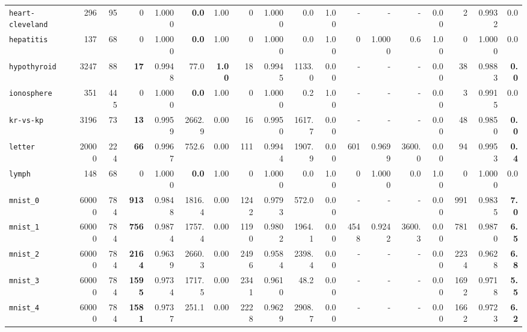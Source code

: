 \begin{tabular}{lccrrrrrrrrrrrrrrr}
\texttt{heart-cleveland} & \multicolumn{1}{r}{296} & \multicolumn{1}{r}{95}  & 0 & 1.0000 & \textbf{0.0} & 1.00 & 0 & 1.0000 & 0.0 & 1.00 & - & - & - & 0.00 & 2 & 0.9932 & 0.0\\
\texttt{hepatitis} & \multicolumn{1}{r}{137} & \multicolumn{1}{r}{68}  & 0 & 1.0000 & \textbf{0.0} & 1.00 & 0 & 1.0000 & 0.0 & 1.00 & 0 & 1.0000 & 0.6 & 1.00 & 0 & 1.0000 & 0.0\\
\texttt{hypothyroid} & \multicolumn{1}{r}{3247} & \multicolumn{1}{r}{88}  & \textbf{17} & 0.9948 & 77.0 & \textbf{1.00} & 18 & 0.9945 & 1133.0 & 0.00 & - & - & - & 0.00 & 38 & 0.9883 & \textbf{0.0}\\
\texttt{ionosphere} & \multicolumn{1}{r}{351} & \multicolumn{1}{r}{445}  & 0 & 1.0000 & \textbf{0.0} & 1.00 & 0 & 1.0000 & 0.2 & 1.00 & - & - & - & 0.00 & 3 & 0.9915 & 0.0\\
\texttt{kr-vs-kp} & \multicolumn{1}{r}{3196} & \multicolumn{1}{r}{73}  & \textbf{13} & 0.9959 & 2662.9 & 0.00 & 16 & 0.9950 & 1617.7 & 0.00 & - & - & - & 0.00 & 48 & 0.9850 & \textbf{0.0}\\
\texttt{letter} & \multicolumn{1}{r}{20000} & \multicolumn{1}{r}{224}  & \textbf{66} & 0.9967 & 752.6 & 0.00 & 111 & 0.9944 & 1907.9 & 0.00 & 601 & 0.9699 & 3600.0 & 0.00 & 94 & 0.9953 & \textbf{0.4}\\
\texttt{lymph} & \multicolumn{1}{r}{148} & \multicolumn{1}{r}{68}  & 0 & 1.0000 & \textbf{0.0} & 1.00 & 0 & 1.0000 & 0.0 & 1.00 & 0 & 1.0000 & 0.0 & 1.00 & 0 & 1.0000 & 0.0\\
\texttt{mnist\_0} & \multicolumn{1}{r}{60000} & \multicolumn{1}{r}{784}  & \textbf{913} & 0.9848 & 1816.4 & 0.00 & 1242 & 0.9793 & 572.0 & 0.00 & - & - & - & 0.00 & 991 & 0.9835 & \textbf{7.0}\\
\texttt{mnist\_1} & \multicolumn{1}{r}{60000} & \multicolumn{1}{r}{784}  & \textbf{756} & 0.9874 & 1757.4 & 0.00 & 1190 & 0.9802 & 1964.1 & 0.00 & 4548 & 0.9242 & 3600.3 & 0.00 & 781 & 0.9870 & \textbf{6.5}\\
\texttt{mnist\_2} & \multicolumn{1}{r}{60000} & \multicolumn{1}{r}{784}  & \textbf{2164} & 0.9639 & 2660.3 & 0.00 & 2496 & 0.9584 & 2398.4 & 0.00 & - & - & - & 0.00 & 2234 & 0.9628 & \textbf{6.8}\\
\texttt{mnist\_3} & \multicolumn{1}{r}{60000} & \multicolumn{1}{r}{784}  & \textbf{1595} & 0.9734 & 1717.5 & 0.00 & 2341 & 0.9610 & 48.2 & 0.00 & - & - & - & 0.00 & 1692 & 0.9718 & \textbf{5.5}\\
\texttt{mnist\_4} & \multicolumn{1}{r}{60000} & \multicolumn{1}{r}{784}  & \textbf{1581} & 0.9737 & 251.1 & 0.00 & 2228 & 0.9629 & 2908.7 & 0.00 & - & - & - & 0.00 & 1662 & 0.9723 & \textbf{6.2}\\

\end{tabular}
